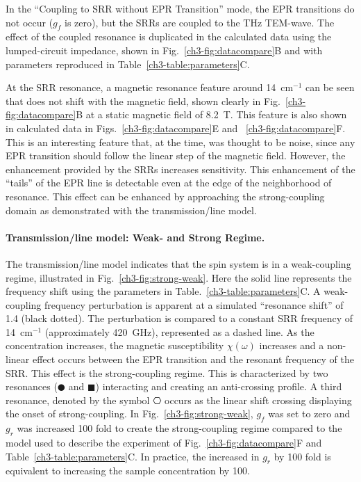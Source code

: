 In the ``Coupling to SRR without EPR Transition'' mode, the EPR transitions do not occur ($g_f$ is zero), but the SRRs are coupled to the THz TEM-wave. The effect of the coupled resonance is duplicated in the calculated data using the lumped-circuit impedance, shown in Fig.~\ref{ch3-fig:datacompare}B and with parameters reproduced in Table~\ref{ch3-table:parameters}C. 

At the SRR resonance, a magnetic resonance feature around 14~cm$^{-1}$ can be seen that does not shift with the magnetic field, shown clearly in Fig.~\ref{ch3-fig:datacompare}B at a static magnetic field of 8.2~T. This feature is also shown in calculated data in Figs.~\ref{ch3-fig:datacompare}E and ~\ref{ch3-fig:datacompare}F. This is an interesting feature that, at the time, was thought to be noise, since any EPR transition should follow the linear step of the magnetic field. However, the enhancement provided by the SRRs increases sensitivity. This enhancement of the ``tails'' of the EPR line is detectable even at the edge of the neighborhood of resonance. This effect can be enhanced by approaching the strong-coupling domain as demonstrated with the transmission\-/line model.

\noindent \paragraph*{Transmission\-/line model: Weak- and Strong Regime.} The transmission\-/line model indicates that the spin system is in a weak-coupling regime, illustrated in Fig.~\ref{ch3-fig:strong-weak}. Here the solid line represents the frequency shift using the parameters in Table.~\ref{ch3-table:parameters}C. A weak-coupling frequency perturbation is apparent at a simulated ``resonance shift'' of 1.4 (black dotted). The perturbation is compared to a constant SRR frequency of 14~cm$^{-1}$ (approximately 420~GHz), represented as a dashed line. As the concentration increases, the magnetic susceptibility $\chi(\omega)$ increases and a non-linear effect occurs between the EPR transition and the resonant frequency of the SRR. This effect is the strong-coupling regime. This is characterized by two resonances ($\CIRCLE$ and $\blacksquare$) interacting and creating an anti-crossing profile. A third resonance, denoted by the symbol $\hexagon$ occurs as the linear shift crossing displaying the onset of strong-coupling. In Fig.~\ref{ch3-fig:strong-weak}, $g_f$ was set to zero and $g_r$ was increased 100 fold to create the strong-coupling regime compared to the model used to describe the experiment of Fig.~\ref{ch3-fig:datacompare}F and Table~\ref{ch3-table:parameters}C. In practice, the increased in $g_r$ by 100 fold is equivalent to increasing the sample concentration by 100.


